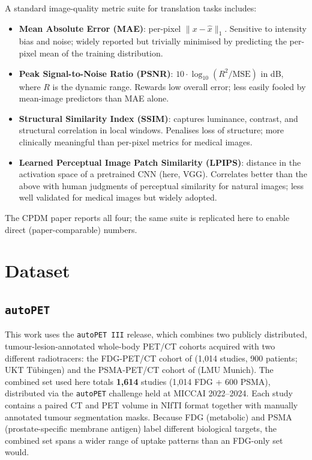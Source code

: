 \documentclass[11pt,a4paper]{article}
\begin{document}
A standard image-quality metric suite for translation tasks includes:
\begin{itemize}
  \item \textbf{Mean Absolute Error (MAE)}: per-pixel $\lVert x - \hat{x} \rVert_1$. 
  Sensitive to intensity bias and noise; widely reported but trivially minimised by 
  predicting the per-pixel mean of the training distribution.
  \item \textbf{Peak Signal-to-Noise Ratio (PSNR)}: $10 \cdot \log_{10}(R^2 / \text{MSE})$ 
  in dB, where $R$ is the dynamic range. Rewards low overall error; less easily 
  fooled by mean-image predictors than MAE alone.
  \item \textbf{Structural Similarity Index (SSIM)}: \parencite{wang2004ssim} 
  captures luminance, contrast, and structural correlation in local windows. 
  Penalises loss of structure; more clinically meaningful than per-pixel 
  metrics for medical images.
  \item \textbf{Learned Perceptual Image Patch Similarity (LPIPS)}: \parencite{zhang2018lpips} 
  distance in the activation space of a pretrained CNN (here, VGG). Correlates 
  better than the above with human judgments of perceptual similarity for natural 
  images; less well validated for medical images but widely adopted.
\end{itemize}

The CPDM paper \parencite{nguyen2025cpdm} reports all four; the same suite is 
replicated here to enable direct (paper-comparable) numbers.

\section{Dataset}

\subsection{\texttt{autoPET}}

This work uses the \texttt{autoPET III} release, which combines two publicly
distributed, tumour-lesion-annotated whole-body PET/CT cohorts acquired with two
different radiotracers: the FDG-PET/CT cohort of \textcite{gatidis2022autopet}
(1{,}014 studies, 900 patients; UKT T\"ubingen) and the PSMA-PET/CT cohort of
\textcite{jeblick2024psma} (LMU Munich). The combined set used here totals
\textbf{1{,}614} studies (1{,}014 FDG + 600 PSMA), distributed via the
\texttt{autoPET} challenge held at MICCAI 2022--2024. Each study contains a paired
CT and PET volume in NIfTI format together with manually annotated tumour
segmentation masks. Because FDG (metabolic) and PSMA (prostate-specific membrane
antigen) label different biological targets, the combined set spans a wider range
of uptake patterns than an FDG-only set would.
\end{document}

